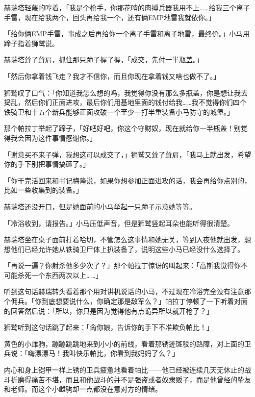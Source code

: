赫瑞塔轻蔑的哼着，「我是个枪手，你那花哨的肉搏兵器我用不上……给我三个离子手雷，现在给我两个，回头再给我一个，还有俩EMP地雷我就依你。」

「给你俩EMP手雷，事成之后再给你一个离子手雷和离子地雷，最终价。」小马用蹄子指着狮鹫说。

赫瑞塔耸了耸肩，抓住那只蹄子握了握，「成交，先付一半瓶盖。」

「然后你拿着钱飞走？我才不信你，而且你现在拿着钱又啥也做不了。」

狮鹫叹了口气：「你知道我怎么想的吗，我觉得你没有那么多瓶盖，你是想让我去捣乱，然后你们正面进攻，最后你们用基地里面的钱付给我……我不觉得你们四个铁骑卫和十五个新兵能够正面攻破一个至少一打半重装备小马防守的城堡。」

那个帕拉丁举起了蹄子，「好吧好吧，你这个守财奴，现在就给你一半瓶盖！别觉得我会因为这件事情感谢你。」

「谢意买不来子弹，我想这可以成交了，」狮鹫又耸了耸肩，「我马上就出发，希望你的手下别把事情搞砸了。」

「你干完活回来和书记梅隆说，如果你想参加正面进攻的话，我会再给你点别的，比如一些收集到的装备。」

赫瑞塔还没开口，但是她面前的小马举起一只蹄子示意她等等。

「冷浴收到，请报告。」小马压低声音，但是狮鹫竖起耳朵也能听得很清楚。

赫瑞塔坐在桌子面前打着哈切，不管怎么这事情和她无关，等到入夜他就出发，想想他们已经允许她从铁骑卫尸体上扒装备了，说明这些小马已经没什么选择了。

「再说一遍？你射杀他多少次了？」那个帕拉丁惊讶的叫起来：「高斯我觉得你不可能杀死一个东西两次以上……」

听到这句话赫瑞转头看着那个用对讲机说话的小马，不过现在冷浴完全没有注意那个佣兵。「你到底想要说什么，你确定那是敌军么？」帕拉丁停顿了一下听着对面的回答然后说：「所以，你只是因为觉得他有点诡异所以就开枪了？」

狮鹫听到这句话跳了起来：「肏你娘，告诉你的手下不准欺负帕比！」

\horizonline


黄色的小雌驹，蹦蹦跳跳地来到小小的前线，看着那锈迹斑驳的路障，对上面的卫兵说：「嗨漂漂马！我叫快乐帕比，你看到我妈妈了么？」

内心和身上铠甲一样上锈的卫兵疲惫地看着帕比——他已经被连续几天无休止的战斗折磨得痛苦不堪，而且和他战斗的并不是强盗或者奴隶贩子，而是他曾经的挚友和老师。而这个小雌驹却一点都没在意对方的情绪。


